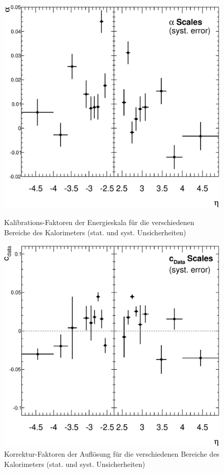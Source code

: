 \begin{figure}
    \begin{minipage}{0.48\textwidth}
        \centering
        \includegraphics[width=1.\textwidth]{plots/alpha_syst}
        \captionsetup{format=plain}
        \caption{Kalibrations-Faktoren der Energieskala für die verschiedenen
            Bereiche des Kalorimeters (stat. und syst. Unsicherheiten)}
        \label{fig:alpha_syst}
    \end{minipage}
    \hfill
    \begin{minipage}{0.48\textwidth}
        \centering
        \includegraphics[width=1.\textwidth]{plots/cdata_syst}
        \captionsetup{format=plain}
        \caption{Korrektur-Faktoren der Auflösung für die verschiedenen
            Bereiche des Kalorimeters (stat. und syst. Unsicherheiten)}
        \label{fig:cdata_syst}
    \end{minipage}
\end{figure}

